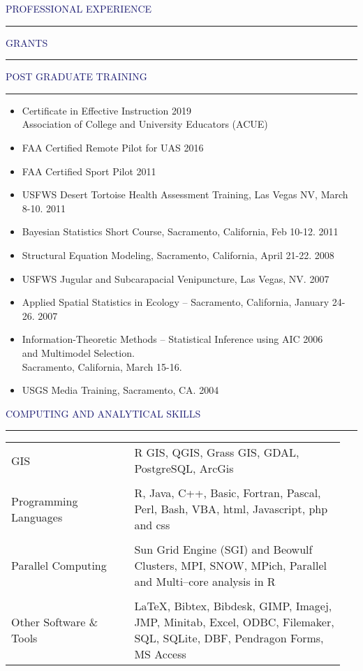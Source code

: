 \documentclass{resume} %
\renewenvironment{rSection}[1]{
\sectionskip
\textcolor{MidnightBlue}{\MakeUppercase{#1}}
\sectionlineskip
\hrule
\begin{list}{}{
\setlength{\leftmargin}{1.5em}
}
\item[]
}{
\end{list}
}
\begin{document}
\begin{rSection}{Professional Experience}
\begin{rSection}{Grants}{}
\end{rSection}
\pagebreak
\begin{rSection}{Post Graduate Training}
\begin{itemize}
\item Certificate in Effective Instruction  \hfill 2019 \\
    Association of College and University Educators (ACUE)
\item FAA Certified Remote Pilot for UAS \hfill 2016
\item FAA Certified Sport Pilot \hfill 2011
\item USFWS Desert Tortoise Health Assessment Training, Las Vegas NV, March 8-10.  \hfill 2011 
\item Bayesian Statistics Short Course, Sacramento, California, Feb 10-12. \hfill  2011
\item Structural Equation Modeling, Sacramento, California, April 21-22. \hfill  2008
\item USFWS Jugular and Subcarapacial Venipuncture, Las Vegas, NV. \hfill  2007
\item Applied Spatial Statistics in Ecology – Sacramento, California, January 24-26. \hfill  2007
\item Information-Theoretic Methods -- Statistical Inference using AIC \hfill 2006 \\
 and Multimodel Selection. \\ Sacramento, California, March 15-16. 
\item USGS Media Training, Sacramento, CA. \hfill  2004
\end{itemize}
\end{rSection}

\begin{rSection}{Computing and Analytical Skills}
\begin{tabular}{p{0.35\linewidth}p{0.6\linewidth}}
GIS & R GIS, QGIS, Grass GIS, GDAL, PostgreSQL, ArcGis \\
\tabularnewline
Programming Languages &  R, Java, C++, Basic, Fortran, Pascal, Perl, Bash, VBA, html, Javascript, php and css\\
\tabularnewline
Parallel Computing & Sun Grid Engine (SGI) and Beowulf Clusters, MPI, SNOW, MPich, Parallel and Multi--core analysis in R\\
\tabularnewline
Other Software \& Tools &   LaTeX, Bibtex, Bibdesk, GIMP, Imagej, JMP, Minitab, Excel, ODBC, Filemaker, SQL, SQLite, DBF, Pendragon Forms, MS Access\\
\end{tabular}
\end{rSection}


\end{rSection}
\end{document}
